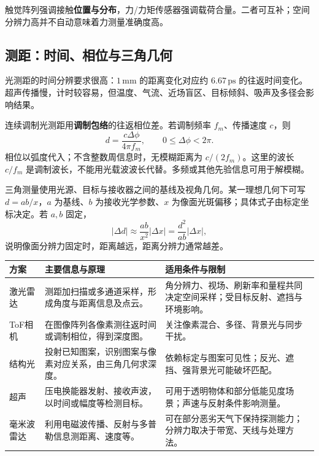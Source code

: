 触觉阵列强调接触\textbf{位置与分布}，力/力矩传感器强调载荷合量。二者可互补；空间分辨力高并不自动意味着力测量准确度高。

\subsection{测距：时间、相位与三角几何}

光测距的时间分辨要求很高：$1\,\mathrm{mm}$ 的距离变化对应约 $6.67\,\mathrm{ps}$ 的往返时间变化。超声传播慢，计时较容易，但温度、气流、近场盲区、目标倾斜、吸声及多径会影响结果。

连续调制光测距用\textbf{调制包络}的往返相位差。若调制频率 $f_m$、传播速度 $c$，则
\[
\boxed{d=\frac{c\Delta\phi}{4\pi f_m}},\qquad
0\leq\Delta\phi<2\pi.
\]
相位以弧度代入；不含整数周信息时，无模糊距离为 $c/(2f_m)$。这里的波长 $c/f_m$ 是调制波长，不能用光载波波长代替。多频或其他先验信息可用于解模糊。

三角测量使用光源、目标与接收器之间的基线及视角几何。某一理想几何下可写 $d=ab/x$，$a$ 为基线、$b$ 为接收光学参数、$x$ 为像面光斑偏移；具体式子由标定坐标决定。若 $a,b$ 固定，
\[
|\Delta d|\approx\frac{ab}{x^2}|\Delta x|
=\frac{d^2}{ab}|\Delta x|,
\]
说明像面分辨力固定时，距离越远，距离分辨力通常越差。

\begin{table}[H]
\centering\small
\begin{tabularx}{\linewidth}{@{}p{2.2cm} X X@{}}
\toprule
方案 & 主要信息与原理 & 适用条件与限制 \\
\midrule
激光雷达 & 测距加扫描或多通道采样，形成角度与距离信息及点云。 & 角分辨力、视场、刷新率和量程共同决定空间采样；受目标反射、遮挡与环境影响。 \\
ToF相机 & 在图像阵列各像素测往返时间或调制相位，得到深度图。 & 关注像素混合、多径、背景光与同步干扰。 \\
结构光 & 投射已知图案，识别图案与像素对应关系，由三角几何求深度。 & 依赖标定与图案可见性；反光、遮挡、强背景光可能破坏匹配。 \\
超声 & 压电换能器发射、接收声波，以时间或幅度等检测目标。 & 可用于透明物体和部分低能见度场景；声速与反射条件影响测量。 \\
毫米波雷达 & 利用电磁波传播、反射与多普勒信息测距离、速度等。 & 可在部分恶劣天气下保持探测能力；分辨力取决于带宽、天线与处理方法。 \\
\bottomrule
\end{tabularx}
\end{table}

